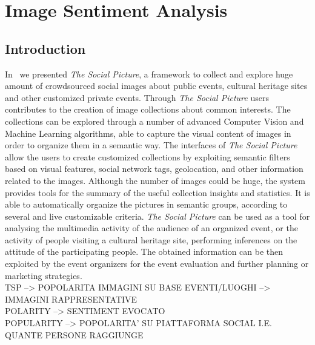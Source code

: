 \chapter{Image Sentiment Analysis}

\section{Introduction}

In~\cite{battiato2016social} we presented \textit{The Social Picture}, a framework to collect and explore huge amount of crowdsourced social images about public events, cultural heritage sites and other customized private events. %
Through \textit{The Social Picture} users contributes to the creation of image collections about common interests. %
The collections can be explored through a number of advanced Computer Vision and Machine Learning algorithms, able to capture the visual content of images in order to organize them in a semantic way. The interfaces of \textit{The Social Picture} allow the users to create customized collections by exploiting semantic filters based on visual features, social network tags, geolocation, and other information related to the images.
Although the number of images could be huge, the system provides tools for the summary of the useful collection insights and statistics. It is able to automatically organize the pictures in semantic groups, according to several and live customizable criteria.
\textit{The Social Picture} can be used as a tool for analysing the multimedia activity of the audience of an organized event, or the activity of people visiting a cultural heritage site, performing inferences on the attitude of the participating people. The obtained information can be then exploited by the event organizers for the event evaluation and further planning or marketing strategies.
\\TSP --> POPOLARITA IMMAGINI SU BASE EVENTI/LUOGHI --> IMMAGINI RAPPRESENTATIVE
\\POLARITY --> SENTIMENT EVOCATO
\\POPULARITY --> POPOLARITA' SU PIATTAFORMA SOCIAL I.E. QUANTE PERSONE RAGGIUNGE


